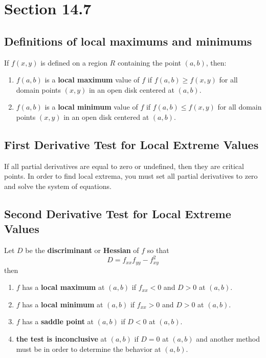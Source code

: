 \documentclass[12pt]{article}
\theoremstyle{break}
\numberwithin{theorem}{subsection}
\numberwithin{lemma}{subsection}
\numberwithin{corollary}{subsection}
\numberwithin{equation}{subsection}
\begin{document}
\newpage
\section{Section 14.7}

\subsection{Definitions of local maximums and minimums}
If $f(x,y)$ is defined on a region $R$ containing the point $(a,b)$, then:
\begin{enumerate}
\item $f(a,b)$ is a \textbf{local maximum} value of $f$ if $f(a,b) \geq f(x,y)$ for all domain
	points $(x,y)$ in an open disk centered at $(a,b)$.
\item $f(a,b)$ is a \textbf{local minimum} value of $f$ if $f(a,b) \leq f(x,y)$ for all domain
	points $(x,y)$ in an open disk centered at $(a,b)$.
\end{enumerate}

\subsection{First Derivative Test for Local Extreme Values}
If all partial derivatives are equal to zero or undefined, then they are critical points.
In order to find local extrema, you must set all partial derivatives to zero and solve the system
of equations.

\subsection{Second Derivative Test for Local Extreme Values}
Let $D$ be the \textbf{discriminant} or \textbf{Hessian} of $f$ so that
\begin{equation*}
D = f_{xx}f_{yy} - f_{xy}^2
\end{equation*}
then 
\begin{enumerate}
\item $f$ has a \textbf{local maximum} at $(a,b)$ if $f_{xx} < 0$ and $D > 0$ at $(a,b)$.
\item $f$ has a \textbf{local minimum} at $(a,b)$ if $f_{xx} > 0$ and $D > 0$ at $(a,b)$.
\item $f$ has a \textbf{saddle point} at $(a,b)$ if $D < 0$ at $(a,b)$.
\item \textbf{the test is inconclusive} at $(a,b)$ if $D = 0$ at $(a,b)$ and another method must be
	in order to determine the behavior at $(a,b)$.
\end{enumerate}
\end{document}
